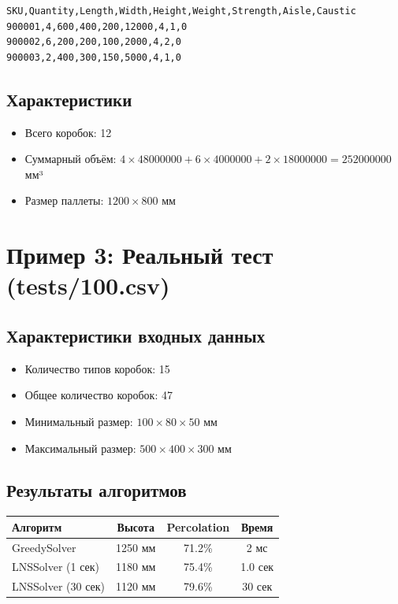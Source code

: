 \begin{verbatim}
SKU,Quantity,Length,Width,Height,Weight,Strength,Aisle,Caustic
900001,4,600,400,200,12000,4,1,0
900002,6,200,200,100,2000,4,2,0
900003,2,400,300,150,5000,4,1,0
\end{verbatim}

\subsection{Характеристики}
\begin{itemize}
    \item Всего коробок: 12
    \item Суммарный объём: $4 \times 48000000 + 6 \times 4000000 + 2 \times 18000000 = 252000000$ мм³
    \item Размер паллеты: $1200 \times 800$ мм
\end{itemize}


\section{Пример 3: Реальный тест (tests/100.csv)}

\subsection{Характеристики входных данных}
\begin{itemize}
    \item Количество типов коробок: 15
    \item Общее количество коробок: 47
    \item Минимальный размер: $100 \times 80 \times 50$ мм
    \item Максимальный размер: $500 \times 400 \times 300$ мм
\end{itemize}

\subsection{Результаты алгоритмов}
\begin{table}[ht]
\centering
\begin{tabular}{|l|c|c|c|}
\hline
\textbf{Алгоритм} & \textbf{Высота} & \textbf{Percolation} & \textbf{Время} \\
\hline
GreedySolver & 1250 мм & 71.2\% & 2 мс \\
LNSSolver (1 сек) & 1180 мм & 75.4\% & 1.0 сек \\
LNSSolver (30 сек) & 1120 мм & 79.6\% & 30 сек \\
\hline
\end{tabular}
\end{table}

